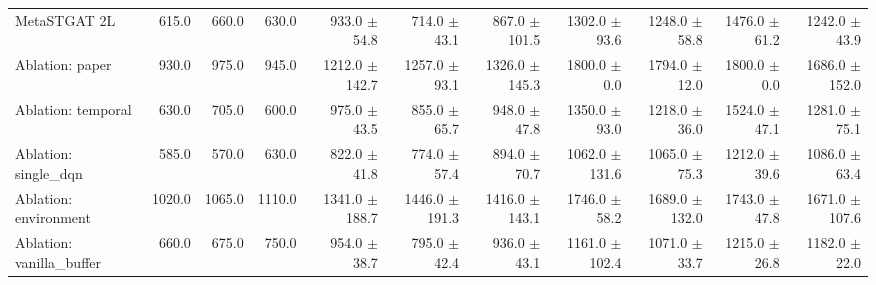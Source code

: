 \begin{table}
\begin{tabular}{@{}lrrrrrrrrrr@{}}
    MetaSTGAT 2L              & 615.0   & 660.0   & 630.0   & 933.0 {\fontsize{4}{4}\selectfont$\pm$54.8}   & 714.0 {\fontsize{4}{4}\selectfont$\pm$43.1}   & 867.0 {\fontsize{4}{4}\selectfont$\pm$101.5}  & 1302.0 {\fontsize{4}{4}\selectfont$\pm$93.6}  & 1248.0 {\fontsize{4}{4}\selectfont$\pm$58.8}  & 1476.0 {\fontsize{4}{4}\selectfont$\pm$61.2}  & 1242.0 {\fontsize{4}{4}\selectfont$\pm$43.9}  \\
    Ablation: paper           & 930.0   & 975.0   & 945.0   & 1212.0 {\fontsize{4}{4}\selectfont$\pm$142.7} & 1257.0 {\fontsize{4}{4}\selectfont$\pm$93.1}  & 1326.0 {\fontsize{4}{4}\selectfont$\pm$145.3} & 1800.0 {\fontsize{4}{4}\selectfont$\pm$0.0}   & 1794.0 {\fontsize{4}{4}\selectfont$\pm$12.0}  & 1800.0 {\fontsize{4}{4}\selectfont$\pm$0.0}   & 1686.0 {\fontsize{4}{4}\selectfont$\pm$152.0} \\
    Ablation: temporal        & 630.0   & 705.0   & 600.0   & 975.0 {\fontsize{4}{4}\selectfont$\pm$43.5}   & 855.0 {\fontsize{4}{4}\selectfont$\pm$65.7}   & 948.0 {\fontsize{4}{4}\selectfont$\pm$47.8}   & 1350.0 {\fontsize{4}{4}\selectfont$\pm$93.0}  & 1218.0 {\fontsize{4}{4}\selectfont$\pm$36.0}  & 1524.0 {\fontsize{4}{4}\selectfont$\pm$47.1}  & 1281.0 {\fontsize{4}{4}\selectfont$\pm$75.1}  \\
    Ablation: single\_dqn     & 585.0   & 570.0   & 630.0   & 822.0 {\fontsize{4}{4}\selectfont$\pm$41.8}   & 774.0 {\fontsize{4}{4}\selectfont$\pm$57.4}   & 894.0 {\fontsize{4}{4}\selectfont$\pm$70.7}   & 1062.0 {\fontsize{4}{4}\selectfont$\pm$131.6} & 1065.0 {\fontsize{4}{4}\selectfont$\pm$75.3}  & 1212.0 {\fontsize{4}{4}\selectfont$\pm$39.6}  & 1086.0 {\fontsize{4}{4}\selectfont$\pm$63.4}  \\
    Ablation: environment     & 1020.0  & 1065.0  & 1110.0  & 1341.0 {\fontsize{4}{4}\selectfont$\pm$188.7} & 1446.0 {\fontsize{4}{4}\selectfont$\pm$191.3} & 1416.0 {\fontsize{4}{4}\selectfont$\pm$143.1} & 1746.0 {\fontsize{4}{4}\selectfont$\pm$58.2}  & 1689.0 {\fontsize{4}{4}\selectfont$\pm$132.0} & 1743.0 {\fontsize{4}{4}\selectfont$\pm$47.8}  & 1671.0 {\fontsize{4}{4}\selectfont$\pm$107.6} \\
    Ablation: vanilla\_buffer & 660.0   & 675.0   & 750.0   & 954.0 {\fontsize{4}{4}\selectfont$\pm$38.7}   & 795.0 {\fontsize{4}{4}\selectfont$\pm$42.4}   & 936.0 {\fontsize{4}{4}\selectfont$\pm$43.1}   & 1161.0 {\fontsize{4}{4}\selectfont$\pm$102.4} & 1071.0 {\fontsize{4}{4}\selectfont$\pm$33.7}  & 1215.0 {\fontsize{4}{4}\selectfont$\pm$26.8}  & 1182.0 {\fontsize{4}{4}\selectfont$\pm$22.0}  \\

\end{tabular}
\end{table}
